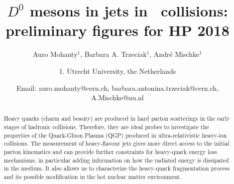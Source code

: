\documentclass[ALICE,manyauthors]{ALICE_analysis_notes}
\begin{document}
%
%
%
\begin{titlepage}
%
\PHdate{\today}
%
\title{$D^{0}$ mesons in jets in \pp\ collisions: preliminary figures for HP 2018}
%
\author{Auro Mohanty$^{1}$, Barbara A. Trzeciak$^{1}$, Andr\'e Mischke$^{1}$}
\author{
1. Utrecht University, the Netherlands\\
}
\author{Email: auro.mohanty@cern.ch, barbara.antonina.trzeciak@cern.ch, A.Mischke@uu.nl}
%
%
\begin{abstract}

Heavy quarks (charm and beauty) are produced in hard parton scatterings in the early stages of hadronic collisions. Therefore, they are ideal probes to investigate the properties of the Quark-Gluon Plasma (QGP) produced in ultra-relativistic heavy-ion collisions. 
The measurement of heavy-flavour jets gives more direct access to the initial parton kinematics and can provide further constraints for heavy-quark energy loss mechanisms, in particular adding information on how the radiated energy is dissipated in the medium. It also allows us to characterize the heavy-quark fragmentation process and its possible modification in the hot nuclear matter environment. 
 

\end{abstract}
\end{titlepage}
\end{document}
